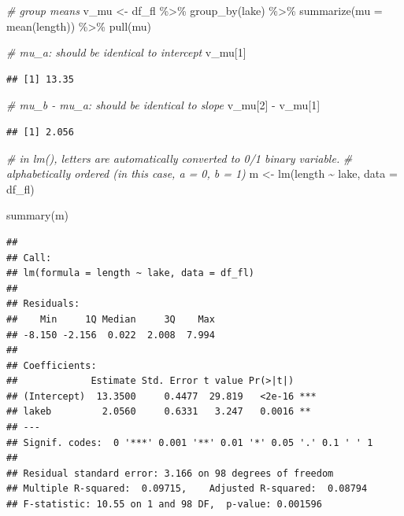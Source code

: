 \documentclass[
]{article}
\newenvironment{Shaded}{\begin{snugshade}}{\end{snugshade}}
\newcommand{\AttributeTok}[1]{\textcolor[rgb]{0.77,0.63,0.00}{#1}}
\newcommand{\CommentTok}[1]{\textcolor[rgb]{0.56,0.35,0.01}{\textit{#1}}}
\newcommand{\DecValTok}[1]{\textcolor[rgb]{0.00,0.00,0.81}{#1}}
\newcommand{\FunctionTok}[1]{\textcolor[rgb]{0.00,0.00,0.00}{#1}}
\newcommand{\NormalTok}[1]{#1}
\newcommand{\OtherTok}[1]{\textcolor[rgb]{0.56,0.35,0.01}{#1}}
\newcommand{\SpecialCharTok}[1]{\textcolor[rgb]{0.00,0.00,0.00}{#1}}
\begin{document}
\begin{Shaded}
\begin{Highlighting}[]
\CommentTok{\# group means}
\NormalTok{v\_mu }\OtherTok{\textless{}{-}}\NormalTok{ df\_fl }\SpecialCharTok{\%\textgreater{}\%} 
  \FunctionTok{group\_by}\NormalTok{(lake) }\SpecialCharTok{\%\textgreater{}\%} 
  \FunctionTok{summarize}\NormalTok{(}\AttributeTok{mu =} \FunctionTok{mean}\NormalTok{(length)) }\SpecialCharTok{\%\textgreater{}\%} 
  \FunctionTok{pull}\NormalTok{(mu)}

\CommentTok{\# mu\_a: should be identical to intercept}
\NormalTok{v\_mu[}\DecValTok{1}\NormalTok{]}
\end{Highlighting}
\end{Shaded}

\begin{verbatim}
## [1] 13.35
\end{verbatim}

\begin{Shaded}
\begin{Highlighting}[]
\CommentTok{\# mu\_b {-} mu\_a: should be identical to slope}
\NormalTok{v\_mu[}\DecValTok{2}\NormalTok{] }\SpecialCharTok{{-}}\NormalTok{ v\_mu[}\DecValTok{1}\NormalTok{]}
\end{Highlighting}
\end{Shaded}

\begin{verbatim}
## [1] 2.056
\end{verbatim}

\begin{Shaded}
\begin{Highlighting}[]
\CommentTok{\# in lm(), letters are automatically converted to 0/1 binary variable.}
\CommentTok{\# alphabetically ordered (in this case, a = 0, b = 1)}
\NormalTok{m }\OtherTok{\textless{}{-}} \FunctionTok{lm}\NormalTok{(length }\SpecialCharTok{\textasciitilde{}}\NormalTok{ lake,}
        \AttributeTok{data =}\NormalTok{ df\_fl)}

\FunctionTok{summary}\NormalTok{(m)}
\end{Highlighting}
\end{Shaded}

\begin{verbatim}
## 
## Call:
## lm(formula = length ~ lake, data = df_fl)
## 
## Residuals:
##    Min     1Q Median     3Q    Max 
## -8.150 -2.156  0.022  2.008  7.994 
## 
## Coefficients:
##             Estimate Std. Error t value Pr(>|t|)    
## (Intercept)  13.3500     0.4477  29.819   <2e-16 ***
## lakeb         2.0560     0.6331   3.247   0.0016 ** 
## ---
## Signif. codes:  0 '***' 0.001 '**' 0.01 '*' 0.05 '.' 0.1 ' ' 1
## 
## Residual standard error: 3.166 on 98 degrees of freedom
## Multiple R-squared:  0.09715,    Adjusted R-squared:  0.08794 
## F-statistic: 10.55 on 1 and 98 DF,  p-value: 0.001596
\end{verbatim}
\end{document}
